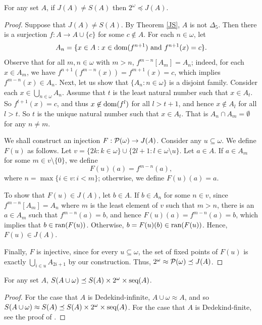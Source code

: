 \begin{lemma}\label{2month}
For any set $A$, if $J(A)\neq S(A)$ then $2^\omega \preceq J(A)$.
\end{lemma}

\begin{proof}
Suppose that $J(A) \neq S(A)$. By Theorem \ref{JS}, $A$ is not $\Delta_5$. Then there is a surjection $f:A \rightarrow A\cup\{c\}$ for some $c\notin A$. For each $n\in\omega$, let $$A_n = \{x\in A : x\in\textup{dom}(f^{n+1}) \text{\ and\ } f^{n+1}(x)=c\}.$$ Observe that for all $m,n\in\omega$ with $m>n$, $f^{m-n}[A_m] = A_n$; indeed, for each $x\in A_{m}$, we have $f^{n+1}(f^{m-n}(x))=f^{m+1}(x)=c$, which implies $f^{m-n}(x)\in A_{n}$. Next, let us show that $\{A_{n}:n\in\omega\}$ is a disjoint family. Consider each $x\in\bigcup_{n\in\omega}A_{n}$. Assume that $t$ is the least natural number such that $x\in A_{t}$. So $f^{t+1}(x)=c$, and thus $x\not\in\textup{dom}(f^{l})$ for all $l>t+1$, and hence $x\not\in A_{l}$ for all $l>t$. So $t$ is the unique natural number such that $x\in A_{t}$. That is $A_{n}\cap A_{m}=\emptyset$ for any $n\neq m$. 

We shall construct an injection $F:\mathcal{P}(\omega) \rightarrow J(A)$. Consider any $u\subseteq\omega$. We define $F(u)$ as follows. Let $v = \{2k : k\in\omega\} \cup \{2l+1 : l\in\omega\setminus u\}$. Let $a\in A$. If $a\in A_m$ for some $m\in v\setminus\{0\}$, we define 
$$ F(u)(a) = f^{m-n}(a), $$
where $n=\max\{i\in v:i<m\}$; otherwise, we define $F(u)(a) = a$.

To show that $F(u) \in J(A)$, let $b\in A$. If $b\in A_n$ for some $n\in v$, since $f^{m-n}[A_m] = A_n$ where $m$ is the least element of $v$ such that $m>n$, there is an $a\in A_m$ such that $f^{m-n}(a)=b$, and hence $F(u)(a) = f^{m-n}(a) = b$, which implies that $b \in \textup{ran}(F(u))$. Otherwise, $b = F(u)(b) \in \textup{ran}(F(u))$. Hence, $F(u) \in J(A)$.

Finally, $F$ is injective, since for every $u \subseteq \omega$, the set of fixed points of $F(u)$ is exactly $\bigcup_{i\in u} A_{2i+1}$ by our construction. Thus, $2^\omega \approx \mathcal{P}(\omega) \preceq J(A)$.
\end{proof}

\begin{lemma}\label{useful}
For any set $A$, $S(A\cup\omega)\preceq S(A)\times 2^{\omega}\times \textup{seq}(A)$.
\end{lemma}

\begin{proof}
For the case that $A$ is Dedekind-infinite, $A\cup\omega\approx A$, and so $S(A\cup\omega)\approx S(A)\preceq S(A)\times 2^{\omega}\times \textup{seq}(A)$. For the case that $A$ is Dedekind-finite, see the proof of \cite[Theorem 2.4]{SonVej2019}.
\end{proof}
 
